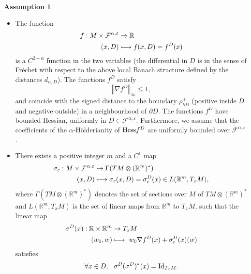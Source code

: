 \documentclass[JEP,XML,SOM,Unicode,NoFloatCountersInSection,published]{cedram}
\newcommand\mto{\mathchoice{\longmapsto}{\mapsto}{\mapsto}{\mapsto}}
\theoremstyle{plain}
\theoremstyle{definition}
\newtheorem{assumption}[thm]{Assumption}
\newcommand{\RR}{{\mathbb R}}
\newcommand{\lVe}{\lt\Vert}
\newcommand{\rVe}{\rt\Vert}
\newcommand{\lt}{\left}
\newcommand{\rt}{\right}
\newcommand{\barD}{D}
\let\a\alpha
\let\e\varepsilon
\let\n\nabla
\let\s\sigma
\newcommand{\cF}{\mathcal{F}}
\begin{document}
\skpt
\begin{assumption}
\label{A6.1}
\begin{itemize}
\item The function
\begin{align*}
f: M\times \cF^{\alpha,\e}&\to \RR\\
(x,D)&\mto f(x,D)=f^D(x)
\end{align*}
is a $C^{2+\a}$ function in the two variables ({the differential in $D$ is in the sense of Fréchet} with respect to the above local Banach structure defined by the distances $d_{\a, D}$).
The functions $f^D$ satisfy
\begin{equation}
\lVe \n f^D\rVe_{\infty}\leq 1,
\end{equation}
and coincide with the signed distance to the boundary $\rho_{\partial D}^+$ (positive inside $D$ and negative outside) in a neighbourhood of $\partial D$.
The functions $f^D$ have bounded Hessian, uniformly in $D\in\cF^{\a,\e}$.
Furthermore, we assume that the coefficients of the $\alpha$-Hölderianity of ${\rm Hess} f^D$ are uniformly bounded over $\cF^{\a,\e}$.
\item
There exists a positive integer $m$ and a $C^1$ map
\begin{align*}
\s_c: M\times \cF^{\alpha,\e}&\to \Gamma(TM\otimes (\RR^m)^\ast)\\
(x,D)&\mto \s_c(x,D)=\s_c^D(x)\in L(\RR^m,T_xM),
\end{align*}
where $\Gamma(TM\otimes (\RR^m)^\ast)$ denotes the set of sections over $M$ of $TM\otimes (\RR^m)^\ast$ and
$L(\RR^m,T_xM)$ is the set of linear maps from $\RR^m$ to $T_xM$,
such that the linear map
\begin{equation}
\begin{split}
\s^D(x): \RR\times \RR^m&\to T_xM \\
(w_0, w)&\mto\ w_0\n f^D(x)+ \sigma_{\mathrm c}^D(x)(w)
\end{split}
\end{equation}
satisfies
\begin{equation}
\forall x\in \barD, \ \ \s^D(\s^D)^\ast (x)={\rm Id}_{T_xM}.
\end{equation}
\end{itemize}
\end{assumption}
\end{document}
